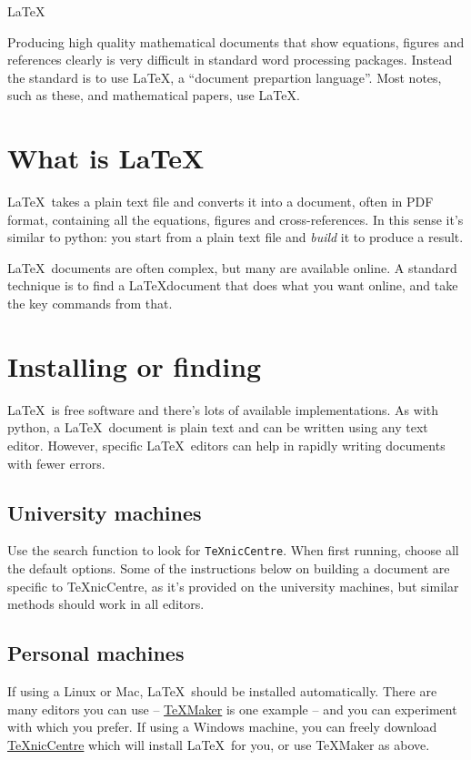 \begin{chapter}{\LaTeX}

Producing high quality mathematical documents that show equations, figures and references clearly is very difficult in standard word processing packages. Instead the standard is to use \LaTeX, a ``document prepartion language''. Most notes, such as these, and mathematical papers, use \LaTeX.

\section{What is \LaTeX}

\LaTeX\ takes a plain text file and converts it into a document, often in PDF format, containing all the equations, figures and cross-references. In this sense it's similar to python: you start from a plain text file and \emph{build} it to produce a result.

\LaTeX\ documents are often complex, but many are available online. A standard technique is to find a \LaTeX document that does what you want online, and take the key commands from that.

\section{Installing or finding}
\label{sec:installing}

\LaTeX\ is free software and there's lots of available implementations. As with python, a \LaTeX\ document is plain text and can be written using any text editor. However, specific \LaTeX\ editors can help in rapidly writing documents with fewer errors.

\subsection{University machines}

Use the search function to look for \texttt{TeXnicCentre}. When first running, choose all the default options. Some of the instructions below on building a document are specific to TeXnicCentre, as it's provided on the university machines, but similar methods should work in all editors.

\subsection{Personal machines}

If using a Linux or Mac, \LaTeX\ should be installed automatically. There are many editors you can use -- \href{http://www.xm1math.net/texmaker/}{TeXMaker} is one example -- and you can experiment with which you prefer. If using a Windows machine, you can freely download \href{http://www.texniccenter.org/}{TeXnicCentre} which will install \LaTeX\ for you, or use TeXMaker as above.


\end{chapter}
